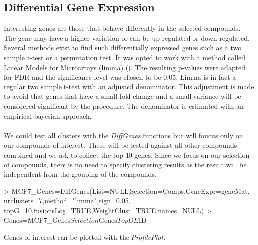 \documentclass[a4paper]{article}
\begin{document}
\subsection{Differential Gene Expression}
Interesting genes are those that behave differently in the selected compounds.
The gene may have a higher variation or can be up-regulated or down-regulated.
Several methods exist to find such differentially expressed genes such as a two
sample t-test or a permutation test. It was opted to work with a method called
Linear Models for Microarrays (limma) (\cite{Smyth2004}). The resulting p-values
were adapted for FDR and the significance level was chosen to be 0.05. Limma is
in fact a regular two sample t-test with an adjusted denominator. This
adjustment is made to avoid that genes that have a small fold change and a small
variance will be considered significant by the procedure. The denominator is
estimated with an empirical bayesian approach.\\ \\
We could test all clusters with the {\it DiffGenes} functions but will foucus
only on our compounds of interest. These will be tested against all other
compounds combined and we ask to collect the top $10$ genes. Since we focus on
our selection of compounds, there is no need to specify clustering results as
the result will be independent from the grouping of the compounds.
\begin{Schunk}
\begin{Sinput}
> MCF7_Genes=DiffGenes(List=NULL,Selection=Comps,GeneExpr=geneMat,
 		             nrclusters=7,method="limma",sign=0.05,
                      topG=10,fusionsLog=TRUE,WeightClust=TRUE,names=NULL)
> Genes=MCF7_Genes$Selection$Genes$TopDE$ID				  
\end{Sinput}
\end{Schunk}
Genes of interest can be plotted with the {\it ProfilePlot}.
\vspace{-0.3cm}
\end{document}

